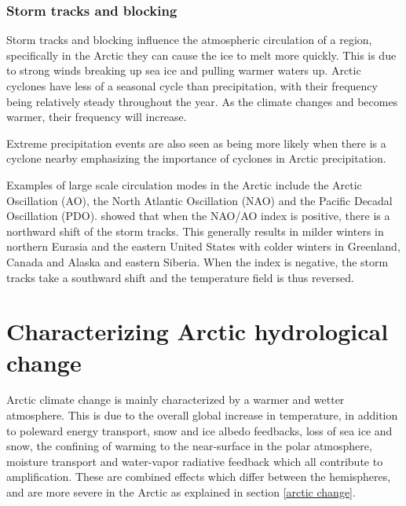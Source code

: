 \documentclass[12pt, oneside]{article}
\begin{document}
\subsubsection{Storm tracks and blocking}
Storm tracks and blocking influence the atmospheric circulation of a region, specifically in the Arctic they can cause the ice to melt more quickly. This is due to strong winds breaking up sea ice and pulling warmer waters up\cite{parker2022influence}. Arctic cyclones have less of a seasonal cycle than precipitation, with their frequency being relatively steady throughout the year. As the climate changes and becomes warmer, their frequency will increase\cite{serreze2022characteristics}. 

Extreme precipitation events are also seen as being more likely when there is a cyclone nearby\cite{serreze2022characteristics} emphasizing the importance of cyclones in Arctic precipitation. 

Examples of large scale circulation modes in the Arctic include the Arctic Oscillation (AO), the North Atlantic Oscillation (NAO) and the Pacific Decadal Oscillation (PDO). \cite{cohen2014recent} showed that when the NAO/AO index is positive, there is a northward shift of the storm tracks. This generally results in milder winters in northern Eurasia and the eastern United States with colder winters in Greenland, Canada and Alaska and eastern Siberia. When the index is negative, the storm tracks take a southward shift and the temperature field is thus reversed.%






\section{Characterizing Arctic hydrological change}\label{change}
Arctic climate change is mainly characterized by a warmer and wetter atmosphere. This is due to the overall global increase in temperature, in addition to poleward energy transport, snow and ice albedo feedbacks, loss of sea ice and snow, the confining of warming to the near-surface in the polar atmosphere, moisture transport and water-vapor radiative feedback which all contribute to amplification\cite{serreze2011processes}. These are combined effects which differ between the hemispheres, and are more severe in the Arctic as explained in section \ref{arctic change}.
\end{document}
